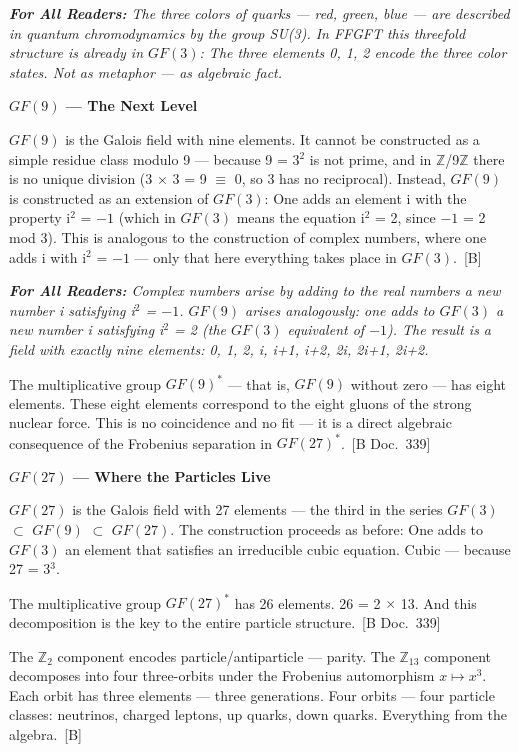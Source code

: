 \documentclass[11pt,oneside]{book}
\newcommand{\status}[1]{\penalty10000\,{\scriptsize\textcolor{gray!60}{[#1]}}}
\newenvironment{laierspur}{%
  \par\vspace{4pt}%
  \noindent\small\itshape\color{blue!60!black}%
  \textbf{For All Readers:}\enspace\ignorespaces}{%
  \par\vspace{4pt}\normalsize\normalfont\normalcolor}
\begin{document}
\begin{laierspur}
The three colors of quarks — red, green, blue — are described in quantum
chromodynamics by the group SU(3). In FFGFT this threefold structure is
already in $GF(3)$: The three elements {0, 1, 2} encode the three color states.
Not as metaphor — as algebraic fact.
\end{laierspur}

\textbf{$GF(9)$ — The Next Level}

$GF(9)$ is the Galois field with nine elements. It cannot be constructed as a
simple residue class modulo 9 — because 9 = 3$^2$ is not prime, and in
$\mathbb{Z}$/9$\mathbb{Z}$ there is no unique division (3 $\times$ 3 = 9 $\equiv$ 0, so 3 has no
reciprocal). Instead, $GF(9)$ is constructed as an extension of $GF(3)$:
One adds an element i with the property i$^2$ = $-1$ (which in $GF(3)$ means the
equation i$^2$ = 2, since $-1$ = 2 mod 3). This is analogous to the construction
of complex numbers, where one adds i with i$^2$ = $-1$ — only that here
everything takes place in $GF(3)$. \status{B}

\begin{laierspur}
Complex numbers arise by adding to the real numbers a new number i
satisfying i$^2$ = $-1$. $GF(9)$ arises analogously: one adds to $GF(3)$ a new
number i satisfying i$^2$ = 2 (the $GF(3)$ equivalent of $-1$). The result is a
field with exactly nine elements: {0, 1, 2, i, i+1, i+2, 2i, 2i+1, 2i+2}.
\end{laierspur}

The multiplicative group $GF(9)^*$ — that is, $GF(9)$ without zero — has eight
elements. These eight elements correspond to the eight gluons of the strong
nuclear force. This is no coincidence and no fit — it is a direct algebraic
consequence of the Frobenius separation in $GF(27)^*$. \status{B Doc.~339}

\textbf{$GF(27)$ — Where the Particles Live}

$GF(27)$ is the Galois field with 27 elements — the third in the series
$GF(3)$ $\subset$ $GF(9)$ $\subset$ $GF(27)$. The construction proceeds as before: One adds to
$GF(3)$ an element that satisfies an irreducible cubic equation. Cubic —
because 27 = 3$^3$.

The multiplicative group $GF(27)^*$ has 26 elements. 26 = 2 $\times$ 13. And
this decomposition is the key to the entire particle structure. \status{B Doc.~339}

The $\mathbb{Z}_2$ component encodes particle/antiparticle — parity.
The $\mathbb{Z}_{13}$ component decomposes into four three-orbits under the
Frobenius automorphism $x \mapsto x^3$. Each orbit has three elements —
three generations. Four orbits — four particle classes: neutrinos, charged
leptons, up quarks, down quarks. Everything from the algebra. \status{B}
\end{document}
